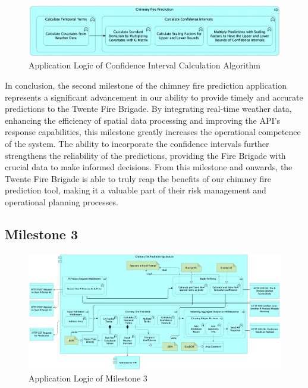 \documentclass{utitcphd_overleaf}
\begin{document}
\begin{figure}[ht]
  \centering
  \includegraphics[width=1\textwidth]{my_images/milestones/m2_CI_logic.pdf}
  \caption{Application Logic of Confidence Interval Calculation Algorithm}
  \label{fig:m2_CI_logic}
\end{figure}

In conclusion, the second milestone of the chimney fire prediction application represents a significant advancement in our ability to provide timely and accurate predictions to the Twente Fire Brigade. By integrating real-time weather data, enhancing the efficiency of spatial data processing and improving the API's response capabilities, this milestone greatly increases the operational competence of the system. The ability to incorporate the confidence intervals further strengthens the reliability of the predictions, providing the Fire Brigade with crucial data to make informed decisions. From this milestone and onwards, the Twente Fire Brigade is able to truly reap the benefits of our chimney fire prediction tool, making it a valuable part of their risk management and operational planning processes.

\subsection{Milestone 3}

\begin{figure}[ht]
  \centering
  \includegraphics[width=1\textwidth]{my_images/milestones/m3-2.pdf}
  \caption{Application Logic of Milestone 3}
  \label{fig:m3_logic}
\end{figure}
\end{document}
